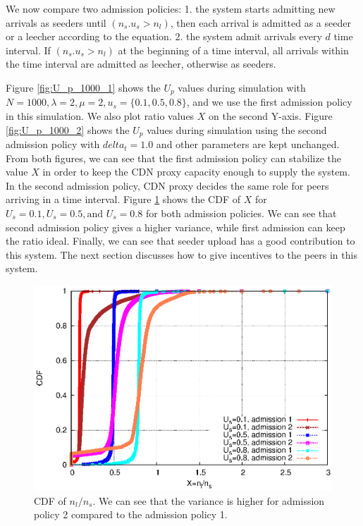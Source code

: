 \documentclass[paper]{ieice}
\begin{document}
We now compare two admission policies:
1. the system starts admitting new arrivals as seeders until $(n_s.u_s > n_l)$, then each arrival is admitted as a seeder or a leecher according to the equation.     
2. the system admit arrivals every $d$ time interval. If $(n_s.u_s > n_l)$ at the beginning of a time interval, all arrivals within the time interval are admitted as leecher, otherwise as seeders.

Figure \ref{fig:U_p_1000_1} shows the $U_p$ values during simulation with $N=1000, \lambda=2, \mu=2, u_s=\{0.1, 0.5, 0.8\}$, and we use the first admission policy in this simulation. 
We also plot ratio values $X$ on the second Y-axis.
Figure \ref{fig:U_p_1000_2} shows the $U_p$ values during simulation using the second admission policy with $delta_t=1.0$ and other parameters are kept unchanged.  
From both figures, we can see that the first admission policy can stabilize the value $X$ in order to keep the CDN proxy capacity enough to supply the system. 
In the second admission policy, CDN proxy decides the same role for peers arriving in a time interval.
Figure \ref{fig:cdf} shows the CDF of $X$ for $U_s=0.1, U_s=0.5, \text{and }  U_s=0.8$ for both admission policies. 
We can see that second admission policy gives a higher variance, while first admission can keep the ratio ideal.
Finally, we can see that seeder upload has a good contribution to this system. 
The next section discusses how to give incentives to the peers in this system.

\begin{figure}[hb] 
\begin{center}
\includegraphics[scale=0.65]{graphs/cdf.eps}
\end{center}
\caption{CDF of $n_l/n_s$. We can see that the variance is higher for admission policy 2 compared to the admission policy 1.}
\label{fig:cdf}
\vspace{-2mm}
\end{figure}
 
\end{document}
